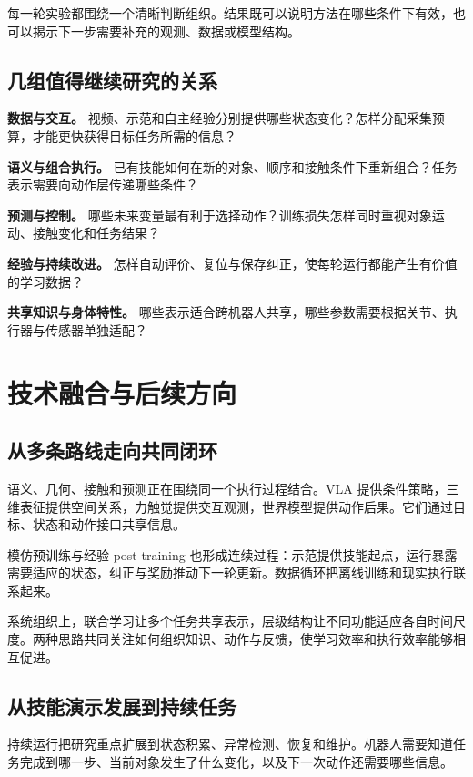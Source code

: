 \documentclass[UTF8,a4paper,11pt,oneside,openany,fontset=none]{ctexbook}
\begin{document}
每一轮实验都围绕一个清晰判断组织。结果既可以说明方法在哪些条件下有效，也可以揭示下一步需要补充的观测、数据或模型结构。

\section{几组值得继续研究的关系}

\textbf{数据与交互。} 视频、示范和自主经验分别提供哪些状态变化？怎样分配采集预算，才能更快获得目标任务所需的信息？

\textbf{语义与组合执行。} 已有技能如何在新的对象、顺序和接触条件下重新组合？任务表示需要向动作层传递哪些条件？

\textbf{预测与控制。} 哪些未来变量最有利于选择动作？训练损失怎样同时重视对象运动、接触变化和任务结果？

\textbf{经验与持续改进。} 怎样自动评价、复位与保存纠正，使每轮运行都能产生有价值的学习数据？

\textbf{共享知识与身体特性。} 哪些表示适合跨机器人共享，哪些参数需要根据关节、执行器与传感器单独适配？

\chapter{技术融合与后续方向}

\section{从多条路线走向共同闭环}

语义、几何、接触和预测正在围绕同一个执行过程结合。VLA 提供条件策略，三维表征提供空间关系，力触觉提供交互观测，世界模型提供动作后果。它们通过目标、状态和动作接口共享信息。

模仿预训练与经验 post-training 也形成连续过程：示范提供技能起点，运行暴露需要适应的状态，纠正与奖励推动下一轮更新。数据循环把离线训练和现实执行联系起来。

系统组织上，联合学习让多个任务共享表示，层级结构让不同功能适应各自时间尺度。两种思路共同关注如何组织知识、动作与反馈，使学习效率和执行效率能够相互促进。

\section{从技能演示发展到持续任务}

持续运行把研究重点扩展到状态积累、异常检测、恢复和维护。机器人需要知道任务完成到哪一步、当前对象发生了什么变化，以及下一次动作还需要哪些信息。
\end{document}
